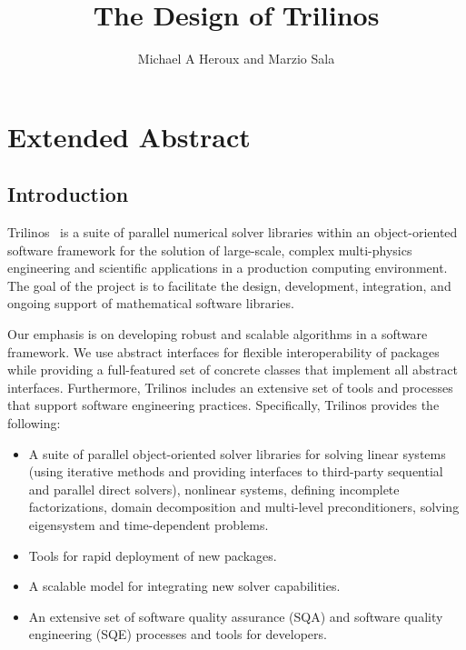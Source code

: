 \documentclass[]{llncs}      %
\begin{document}

\title{The Design of Trilinos}

\author{Michael A Heroux and Marzio Sala}

\maketitle
{}


\section*{Extended Abstract}

\subsection*{Introduction}

Trilinos~\cite{1,2} is a suite of parallel numerical solver libraries
within an object-oriented software framework for the solution of
large-scale, complex multi-physics engineering and scientific
applications in a production computing environment.  The goal of the
project is to facilitate the design, development, integration, and
ongoing support of mathematical software libraries.

Our emphasis is on developing robust and scalable algorithms in a
software framework. We use abstract interfaces for flexible
interoperability of packages while providing a full-featured set of
concrete classes that implement all abstract interfaces.  Furthermore,
Trilinos includes an extensive set of tools and processes that support
software engineering practices.  Specifically, Trilinos provides the
following: 
\begin{itemize}
\item A suite of parallel object-oriented solver libraries for solving
linear systems (using iterative methods and providing interfaces to
third-party sequential and parallel direct solvers), nonlinear systems,
defining incomplete factorizations, domain decomposition and multi-level
preconditioners, solving eigensystem and time-dependent problems.
\item Tools for rapid deployment of new packages.  
\item A scalable model for integrating new solver capabilities.
\item An extensive set of software quality assurance (SQA) and software
quality engineering (SQE) processes and tools for developers.
\end{itemize}
\end{document}
